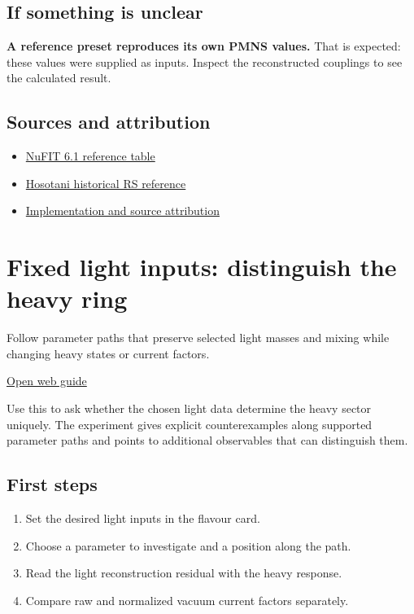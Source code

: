 \documentclass[11pt,a4paper]{article}
\begin{document}
\subsection*{If something is unclear}
\textbf{A reference preset reproduces its own PMNS values.} That is expected: these values were supplied as inputs. Inspect the reconstructed couplings to see the calculated result.

\subsection*{Sources and attribution}
\begin{itemize}
\item \href{https://www.nu-fit.org/sites/default/files/v61.tbl-parameters.pdf}{NuFIT 6.1 reference table}
\item \href{https://arxiv.org/abs/2507.08321}{Hosotani historical RS reference}
\item \href{https://github.com/karlesmarin/ghu-lab/blob/main/src/modules/neutrino_flavour.mjs}{Implementation and source attribution}
\end{itemize}
\section{Fixed light inputs: distinguish the heavy ring}
Follow parameter paths that preserve selected light masses and mixing while changing heavy states or current factors.

\href{https://karlesmarin.github.io/ghu-explorer/guide/identifiability/index.html}{Open web guide}

Use this to ask whether the chosen light data determine the heavy sector uniquely. The experiment gives explicit counterexamples along supported parameter paths and points to additional observables that can distinguish them.
\subsection*{First steps}
\begin{enumerate}
\item Set the desired light inputs in the flavour card.
\item Choose a parameter to investigate and a position along the path.
\item Read the light reconstruction residual with the heavy response.
\item Compare raw and normalized vacuum current factors separately.
\end{enumerate}
\end{document}
